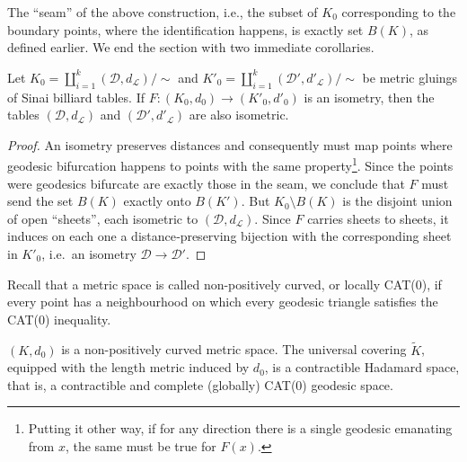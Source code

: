 \documentclass[reqno,11pt]{amsart}
\begin{document}
The ``seam'' of the above construction, i.e., the subset of \(K_0\) corresponding to the boundary points, where the identification happens, is exactly set \(B(K)\), as defined earlier. 
We end the section with two immediate corollaries.
\begin{corollary}\label{cor:isometry-preserves-boundary}
Let \(K_0 = \coprod_{i=1}^k (\mathcal{D}, d_\mathcal{L})/\!\!\sim\) and \(K'_0 = \coprod_{i=1}^k (\mathcal{D}', d'_{\mathcal{L}})/\!\!\sim\) be metric gluings of Sinai billiard tables. 
If \(F\colon (K_0, d_0) \to (K'_0, d'_0)\) is an isometry, then the tables \((\mathcal{D}, d_\mathcal{L})\) and \((\mathcal{D}', d'_\mathcal{L})\) are also isometric.
\end{corollary}
\begin{proof}
An isometry preserves distances and consequently must map points where geodesic bifurcation happens to points with the same property\footnote{
    Putting it other way, if for any direction there is a single geodesic emanating from \(x\), the same must be true for \(F(x)\).}.    
Since the points were geodesics bifurcate are exactly those in the seam, we conclude that \(F\)
must send the set \(B(K)\) exactly onto \(B(K')\).  
But \(K_0\setminus B(K)\) is the disjoint union of open ``sheets'', each isometric to \((\mathcal{D},d_\mathcal{L})\).
Since \(F\) carries sheets to sheets, it induces on each one a distance‐preserving bijection with the corresponding sheet in \(K'_0\), i.e.\ an isometry \(\mathcal{D}\to\mathcal{D}'\).  
\end{proof}
\par Recall that a metric space is called non-positively curved, or locally CAT(0), if every point has a neighbourhood on which every geodesic triangle satisfies the CAT(0) inequality.
\begin{corollary}
    \( (K, d_0) \) is a non-positively curved metric space.
    The universal covering  \( \tilde K \), equipped with the length metric induced by \(d_0\), is a contractible Hadamard space, that is, a contractible and complete (globally) CAT(0) geodesic space. 
\end{corollary}
\end{document}
